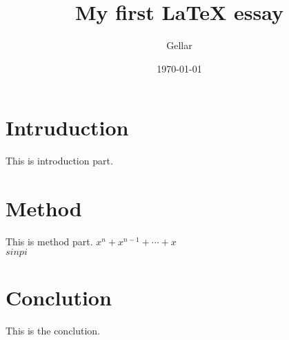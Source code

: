 \documentclass{article} %
\title{My first LaTeX essay} %
\author{Gellar} %
\date{\today} %
\begin{document}
\maketitle %

\section{Intruduction} %
This is introduction part.

\section{Method} %
This is method part.\newline
$x^n + x^{n-1} + \cdots + x$\\
$sin{pi}$

\section{Conclution} %
This is the conclution.
\end{document}

